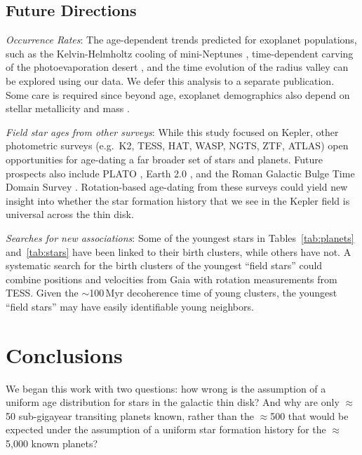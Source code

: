 \documentclass[11pt,twocolumn,tighten,linenumbers]{aastex63}
\begin{document}
\subsection{Future Directions}

{\it Occurrence Rates}:
The age-dependent trends predicted for exoplanet populations, such as
the Kelvin-Helmholtz cooling of mini-Neptunes \citep{Gupta_2019},
time-dependent carving of the photoevaporation desert
\citep{Owen2018}, and the time evolution of the radius valley
\citep{Rogers_2021} can be explored using our data.  We defer this
analysis to a separate publication.  Some care is required since
beyond age, exoplanet demographics also depend on stellar metallicity
and mass \citep[e.g.][]{Petigura_2018,Miyazaki2023}.  

{\it Field star ages from other surveys}:
While this study focused on Kepler, other photometric surveys
(e.g.~K2, TESS, HAT, WASP, NGTS, ZTF, ATLAS) open opportunities for
age-dating a far broader set of stars and planets.  Future prospects
also include PLATO \citep{Rauer14}, Earth 2.0
\citep{2022arXiv220606693G}, and the Roman Galactic Bulge Time Domain
Survey \citep{Wilson2023}.  Rotation-based age-dating from these surveys could
yield new insight
into whether the star formation history that we see in the Kepler field is
universal across the thin disk.

{\it Searches for new associations}:
Some of the youngest stars in Tables~\ref{tab:planets}
and~\ref{tab:stars} have been linked to their birth clusters, while
others have not. A systematic search for the birth clusters of the
youngest ``field stars'' could combine positions and velocities from
Gaia with rotation measurements from TESS. Given the $\sim$100\,Myr
decoherence time of young clusters, the youngest ``field stars'' may
have easily identifiable young neighbors.



\section{Conclusions}
\label{sec:conclusions}

We began this work with two questions: how wrong is the assumption of
a uniform age distribution for stars in the galactic thin disk?  And
why are only $\approx$50 sub-gigayear transiting planets known, rather
than the $\approx$500 that would be expected under the assumption of a
uniform star formation history for the $\approx$5{,}000 known planets?
\end{document}
